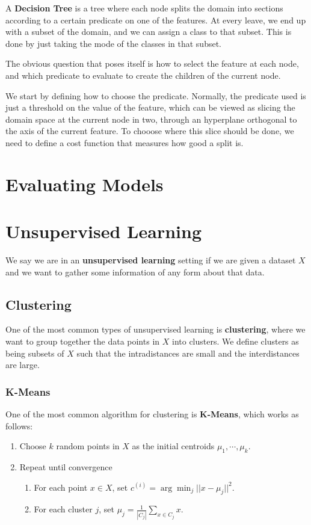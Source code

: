 \documentclass{article}
\begin{document}
A \textbf{Decision Tree} is a tree where each node splits the domain into sections according to a certain predicate on one of the features.
At every leave, we end up with a subset of the domain, and we can assign a class to that subset.
This is done by just taking the mode of the classes in that subset.

The obvious question that poses itself is how to select the feature at each node, and which predicate to evaluate to create the children of the current node.

We start by defining how to choose the predicate.
Normally, the predicate used is just a threshold on the value of the feature, which can be viewed as slicing the domain space at the current node in two, through an hyperplane orthogonal to the axis of the current feature.
To chooose where this slice should be done, we need to define a cost function that measures how good a split is.

\section{Evaluating Models}

\section{Unsupervised Learning}

We say we are in an \textbf{unsupervised learning} setting if we are given a dataset $X$ and we want to gather some information of any form about that data.

\subsection{Clustering}

One of the most common types of unsupervised learning is \textbf{clustering}, where we want to group together the data points in $X$ into clusters.
We define clusters as being subsets of $X$ such that the intradistances are small and the interdistances are large.

\subsubsection{K-Means}

One of the most common algorithm for clustering is \textbf{K-Means}, which works as follows:
\begin{enumerate}
\item Choose $k$ random points in $X$ as the initial centroids $\mu_1, \cdots, \mu_k$.
\item Repeat until convergence
\begin{enumerate}
\item For each point $x \in X$, set $c^{(i)} = \arg\min_{j} ||x-\mu_j||^2$.
\item For each cluster $j$, set $\mu_j = \frac{1}{|C_j|} \sum_{x \in C_j} x$.
\end{enumerate}
\end{enumerate}
\end{document}
